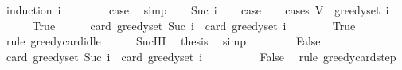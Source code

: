 \begin{isabellebody}
%
\isadelimproof
%
\endisadelimproof
%
\isatagproof
{}\isamarkupfalse%
\ {\isacharparenleft}{\kern0pt}induction\ i{\isacharparenright}{\kern0pt}\isanewline
\ \ \isamarkupfalse%
\ {}\isanewline
\ \ \isamarkupfalse%
\ {\isacharquery}{\kern0pt}case\ \isamarkupfalse%
\ simp\isanewline
{}\isamarkupfalse%
\isanewline
\ \ \isamarkupfalse%
\ {\isacharparenleft}{\kern0pt}Suc\ i{\isacharparenright}{\kern0pt}\isanewline
\ \ \isamarkupfalse%
\ {\isacharquery}{\kern0pt}case\isanewline
\ \ \isamarkupfalse%
\ {\isacharparenleft}{\kern0pt}cases\ {\isachardoublequoteopen}V\ {\isacharminus}{\kern0pt}\ greedy{\isacharunderscore}{\kern0pt}set\ i\ {\isacharequal}{\kern0pt}\ {\isacharbraceleft}{\kern0pt}{\isacharbraceright}{\kern0pt}{\isachardoublequoteclose}{\isacharparenright}{\kern0pt}\isanewline
\ \ \ \ \isamarkupfalse%
\ True\isanewline
\ \ \ \ \isamarkupfalse%
\ {\isachardoublequoteopen}card\ {\isacharparenleft}{\kern0pt}greedy{\isacharunderscore}{\kern0pt}set\ {\isacharparenleft}{\kern0pt}Suc\ i{\isacharparenright}{\kern0pt}{\isacharparenright}{\kern0pt}\ {\isacharequal}{\kern0pt}\ card\ {\isacharparenleft}{\kern0pt}greedy{\isacharunderscore}{\kern0pt}set\ i{\isacharparenright}{\kern0pt}{\isachardoublequoteclose}\isanewline
\ \ \ \ \ \ \isamarkupfalse%
\ True\ \isamarkupfalse%
\ {\isacharparenleft}{\kern0pt}rule\ greedy{\isacharunderscore}{\kern0pt}card{\isacharunderscore}{\kern0pt}idle{\isacharparenright}{\kern0pt}\isanewline
\ \ \ \ \isamarkupfalse%
\ Suc{\isachardot}{\kern0pt}IH\ \isamarkupfalse%
\ {\isacharquery}{\kern0pt}thesis\ \isamarkupfalse%
\ simp\isanewline
\ \ \isamarkupfalse%
\isanewline
\ \ \ \ \isamarkupfalse%
\ False\isanewline
\ \ \ \ \isamarkupfalse%
\ {\isachardoublequoteopen}card\ {\isacharparenleft}{\kern0pt}greedy{\isacharunderscore}{\kern0pt}set\ {\isacharparenleft}{\kern0pt}Suc\ i{\isacharparenright}{\kern0pt}{\isacharparenright}{\kern0pt}\ {\isacharequal}{\kern0pt}\ card\ {\isacharparenleft}{\kern0pt}greedy{\isacharunderscore}{\kern0pt}set\ i{\isacharparenright}{\kern0pt}\ {\isacharplus}{\kern0pt}\ {}{\isachardoublequoteclose}\isanewline
\ \ \ \ \ \ \isamarkupfalse%
\ False\ \isamarkupfalse%
\ {\isacharparenleft}{\kern0pt}rule\ greedy{\isacharunderscore}{\kern0pt}card{\isacharunderscore}{\kern0pt}step{\isacharparenright}{\kern0pt}\isanewline

\end{isabellebody}
